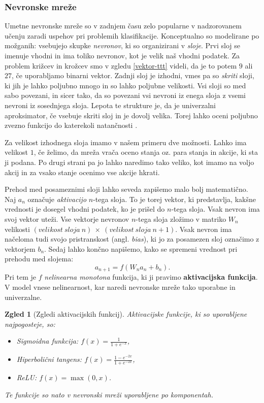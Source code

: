 \documentclass[12pt,a4paper]{amsart}
\theoremstyle{definition} %
\theoremstyle{plain} %
\newtheorem{zgled}[definicija]{Zgled}
\begin{document}
\subsubsection{Nevronske mreže}
Umetne nevronske mreže so v zadnjem času zelo popularne v nadzorovanem učenju zaradi uspehov pri 
problemih klasifikacije. Konceptualno so modelirane po možganih: vsebujejo skupke \textit{nevronov}, 
ki so organizirani v \textit{sloje}. Prvi sloj se imenuje vhodni in ima toliko nevronov, kot je velik 
naš vhodni podatek. Za problem križcev in krožcev smo v zgledu \ref{vektor-ttt} videli, da je to potem 
$9$ ali $27$, če uporabljamo binarni vektor. Zadnji sloj je izhodni, vmes pa so \textit{skriti} sloji, 
ki jih je lahko poljubno mnogo in so lahko poljubne velikosti. Vsi sloji so med sabo povezani, in sicer 
tako, da so povezani vsi nevroni iz enega sloja z vsemi nevroni iz sosednjega sloja. Lepota te strukture
je, da je univerzalni aproksimator, če vsebuje skriti sloj in je dovolj velika. Torej lahko oceni 
poljubno zvezno funkcijo do katerekoli natančnosti \cite{NN}.

Za velikost izhodnega sloja imamo v našem primeru dve možnosti. Lahko ima velikost $1$, če želimo, 
da mreža vrača oceno stanja oz. para stanja in akcije, ki sta ji podana. Po drugi strani pa jo lahko 
naredimo tako veliko, kot imamo na voljo akcij in za vsako stanje ocenimo vse akcije hkrati. 

Prehod med posameznimi sloji lahko seveda zapišemo malo bolj matematično. Naj $a_n$ označuje 
\textit{aktivacijo} $n$-tega sloja. To je torej vektor, ki predstavlja, kakšne vrednosti je dosegel
vhodni podatek, ko je prišel do $n$-tega sloja. Vsak nevron ima svoj vektor uteži. Vse vektorje nevronov 
$n$-tega sloja zložimo v matriko $W_n$ velikosti $(velikost~sloja~n)~\times~(velikost~sloja~n + 1)$. Vsak 
nevron ima načeloma tudi svojo pristranskost (angl. \textit{bias}), ki jo za posamezen sloj označimo z 
vektorjem $b_n$. Sedaj lahko končno napišemo, kako se spremeni vrednost pri prehodu med slojema:
$$
a_{n+1} = f(W_n a_n + b_n).
$$
Pri tem je $f$ \textit{nelinearna monotona} funkcija, ki ji pravimo \textbf{aktivacijska funkcija}. 
V model vnese nelinearnost, kar naredi nevronske mreže tako uporabne in univerzalne. 

\begin{zgled}[Zgledi aktivacijskih funkcij]
    Aktivacijske funkcije, ki so uporabljene najpogosteje, so:
    \begin{itemize}
        \item Sigmoidna funkcija: $f(x) = \frac{1}{1 + e^{-x}}$, 
        \item Hiperbolični tangens: $f(x) = \frac{1 - e^{-2x}}{1 + e^{-2x}}$,
        \item ReLU: $f(x) = \max(0, x)$.
    \end{itemize}
    Te funkcije so nato v nevronski mreži uporabljene po komponentah.
\end{zgled}
\end{document}
